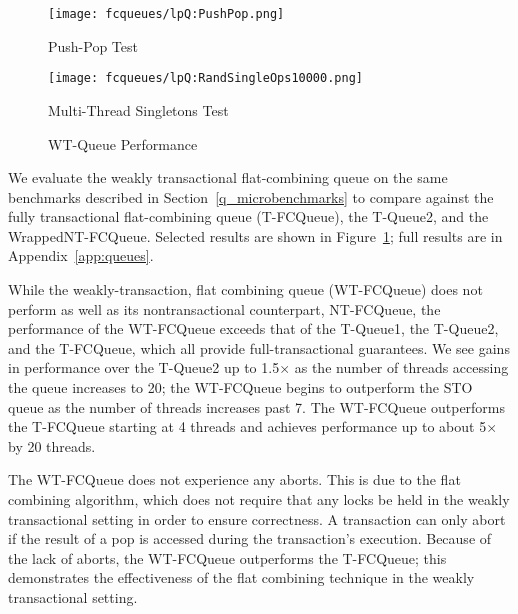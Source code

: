 \begin{figure}[t]
    \centering
	\begin{minipage}{0.45\textwidth}
	    \texttt{[image: fcqueues/lpQ:PushPop.png]}
        \caption*{Push-Pop Test}
	\end{minipage}
	\begin{minipage}{0.45\textwidth}
	    \texttt{[image: fcqueues/lpQ:RandSingleOps10000.png]}
        \caption*{Multi-Thread Singletons Test}
	\end{minipage}
    \caption{WT-Queue Performance}
    \label{fig:wtqs}
\end{figure}


We evaluate the weakly transactional flat-combining queue on the same benchmarks described in Section~\ref{q_microbenchmarks} to compare against the fully transactional flat-combining queue (T-FCQueue), the T-Queue2, and the WrappedNT-FCQueue. Selected results are shown in Figure~\ref{fig:wtqs}; full results are in Appendix~\ref{app:queues}. 

While the weakly-transaction, flat combining queue (WT-FCQueue) does not perform as well as its nontransactional counterpart, NT-FCQueue, the performance of the WT-FCQueue exceeds that of the T-Queue1, the T-Queue2, and the T-FCQueue, which all provide full-transactional guarantees. We see gains in performance over the T-Queue2 up to 1.5$\times$ as the number of threads accessing the queue increases to 20; the WT-FCQueue begins to outperform the STO queue as the number of threads increases past 7. The WT-FCQueue outperforms the T-FCQueue starting at 4 threads and achieves performance up to about 5$\times$ by 20 threads.
 
The WT-FCQueue does not experience any aborts. This is due to the flat combining algorithm, which does not require that any locks be held in the weakly transactional setting in order to ensure correctness. A transaction can only abort if the result of a pop is accessed during the transaction's execution.
Because of the lack of aborts, the WT-FCQueue outperforms the T-FCQueue; this demonstrates the effectiveness of the flat combining technique in the weakly transactional setting. 

